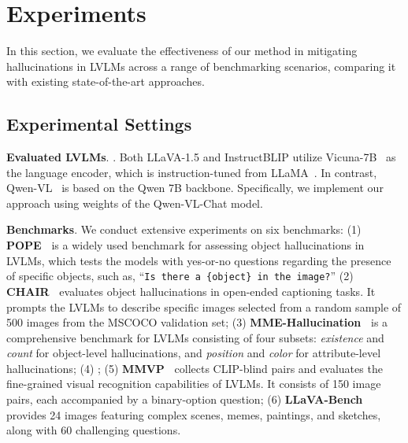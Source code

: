
\section{Experiments}
\label{sec:experiment}
In this section, we evaluate the effectiveness of our method in mitigating hallucinations in LVLMs across a range of benchmarking scenarios, comparing it with existing state-of-the-art approaches. 


\subsection{Experimental Settings}
\textbf{Evaluated LVLMs}. . Both LLaVA-1.5 and InstructBLIP utilize Vicuna-7B~\citep{chiang2023vicuna} as the language encoder, which is instruction-tuned from LLaMA~\citep{touvron2023llama}. In contrast, Qwen-VL~\citep{bai2023qwen} is based on the Qwen 7B backbone. Specifically, we implement our approach using weights of the Qwen-VL-Chat model.



\textbf{Benchmarks}. We conduct extensive experiments on six benchmarks: (1) \textbf{POPE~\citep{li2023evaluating}} is a widely used benchmark for assessing object hallucinations in LVLMs, which tests the models with yes-or-no questions regarding the presence of specific objects, such as, ``\texttt{Is there a \{object\} in the image?}'' (2) \textbf{CHAIR~\citep{rohrbach2018object}} evaluates object hallucinations in open-ended captioning tasks. It prompts the LVLMs to describe specific images selected from a random sample of 500 images from the MSCOCO validation set; (3) \textbf{MME-Hallucination~\citep{fu2023mme}} is a comprehensive benchmark for LVLMs consisting of four subsets: \textit{existence} and \textit{count} for object-level hallucinations, and \textit{position} and \textit{color} for attribute-level hallucinations; (4) ; (5) \textbf{MMVP~\citep{tong2024eyes}} collects CLIP-blind pairs and evaluates the fine-grained visual recognition capabilities of LVLMs. It consists of 150 image pairs, each accompanied by a binary-option question; (6) \textbf{LLaVA-Bench} provides 24 images featuring complex scenes, memes, paintings, and sketches, along with 60 challenging questions.

